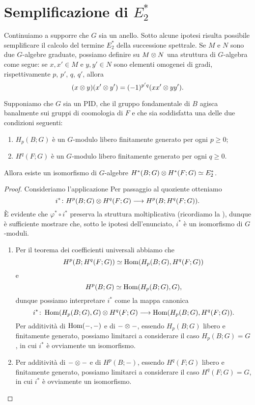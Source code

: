 \section{Semplificazione di \texorpdfstring{\(E^*_2\)}{E*2}}
Continuiamo a supporre che \(G\) sia un anello. Sotto alcune ipotesi risulta possibile semplificare il calcolo del termine \(E^\ast_2\) della successione spettrale. Se \(M\) e \(N\) sono due \(G\)-algebre graduate, possiamo definire su \(M\mathbin{\otimes} N\) una struttura di \(G\)-algebra come segue: se \(x,x'\in M\) e \(y,y'\in N\) sono elementi omogenei di gradi, rispettivamente \(p\), \(p'\), \(q\), \(q'\), allora
\[
(x\mathbin{\otimes} y)(x'\mathbin{\otimes} y')=(-1)^{p'q}(xx'\mathbin{\otimes} yy').
\]
\begin{proposition}
Supponiamo che \(G\) sia un PID, che il gruppo fondamentale di \(B\) agisca banalmente sui gruppi di coomologia di \(F\) e che sia soddisfatta una delle due condizioni seguenti:
\begin{enumerate}
\item \(H_p(B;G)\) è un \(G\)-modulo libero finitamente generato per ogni \(p\ge 0\);
\item \(H^q(F;G)\) è un \(G\)-modulo libero finitamente generato per ogni \(q\ge 0\).
\end{enumerate}
Allora esiste un isomorfismo di \(G\)-algebre \(H^*(B;G)\mathbin{\otimes} H^*(F;G)\simeq E^\ast_2\).
\end{proposition}
\begin{proof}
Consideriamo l'applicazione
Per passaggio al quoziente otteniamo
\[
\map{i^*}{H^p(B;G)\tensor H^q(F;G)}{H^p(B;H^q(F;G))}.
\]
È evidente che \(\varphi^*\circ i^*\) preserva la struttura moltiplicativa (ricordiamo la ), dunque è sufficiente mostrare che, sotto le ipotesi dell'enunciato, \(i^*\) è un isomorfismo di \(G\)-moduli.
\begin{enumerate}
\item Per il teorema dei coefficienti universali abbiamo che
\[
H^p(B;H^q(F;G))\simeq\operatorname{Hom}(H_p(B;G),H^q(F;G))
\]
e
\[
H^p(B;G)\simeq\operatorname{Hom}(H_p(B;G),G),
\]
dunque possiamo interpretare \(i^*\) come la mappa canonica
\[
\map{i^*}{\Hom(H_p(B;G),G)\tensor H^q(F;G)}{\Hom(H_p(B;G),H^q(F;G))}.
\]
Per additività di \(\operatorname{Hom}(-,-)\) e di \(-\mathbin{\otimes}-\), essendo \(H_p(B;G)\) libero e finitamente generato, possiamo limitarci a considerare il caso \(H_p(B;G)=G\), in cui \(i^*\) è ovviamente un isomorfismo.
\item Per additività di \(-\mathbin{\otimes}-\) e di \(H^p(B;-)\), essendo \(H^q(F;G)\) libero e finitamente generato, possiamo limitarci a considerare il caso \(H^q(F;G)=G\), in cui \(i^*\) è ovviamente un isomorfismo.\qedhere
\end{enumerate}
\end{proof}

